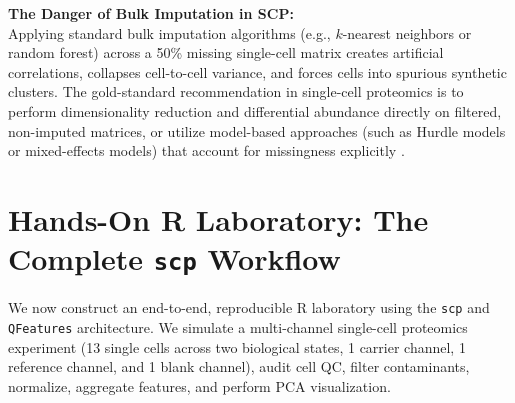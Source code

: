 \documentclass[11pt,twoside,openright]{book}
\begin{document}
\begin{deepdive}
\textbf{The Danger of Bulk Imputation in SCP:}\\
Applying standard bulk imputation algorithms (e.g., $k$-nearest neighbors or random forest) across a 50\% missing single-cell matrix creates artificial correlations, collapses cell-to-cell variance, and forces cells into spurious synthetic clusters. The gold-standard recommendation in single-cell proteomics is to perform dimensionality reduction and differential abundance directly on filtered, non-imputed matrices, or utilize model-based approaches (such as Hurdle models or mixed-effects models) that account for missingness explicitly \cite{choi2014msstats, squair2021confronting, zimmerman2021practical}.
\end{deepdive}

\section{Hands-On R Laboratory: The Complete \texttt{scp} Workflow}

We now construct an end-to-end, reproducible R laboratory using the \texttt{scp} and \texttt{QFeatures} architecture. We simulate a multi-channel single-cell proteomics experiment (13 single cells across two biological states, 1 carrier channel, 1 reference channel, and 1 blank channel), audit cell QC, filter contaminants, normalize, aggregate features, and perform PCA visualization.
\end{document}
